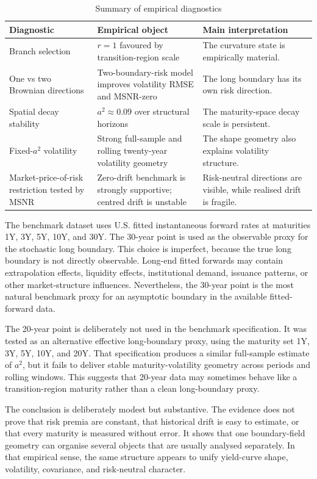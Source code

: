 \documentclass[11pt]{article}
\begin{document}
\begin{table}[htbp]
\centering
\caption{Summary of empirical diagnostics}
\label{tab:diagnostics}
\small
\begin{tabularx}{\textwidth}{@{}p{}p{}X@{}}
\toprule
Diagnostic & Empirical object & Main interpretation \\
\midrule
Branch selection & $r=1$ favoured by transition-region scale & The curvature state is empirically material. \\
One vs two Brownian directions & Two-boundary-risk model improves volatility RMSE and MSNR-zero & The long boundary has its own risk direction. \\
Spatial decay stability & $a^2\approx 0.09$ over structural horizons & The maturity-space decay scale is persistent. \\
Fixed-$a^2$ volatility & Strong full-sample and rolling twenty-year volatility geometry & The shape geometry also explains volatility structure. \\
Market-price-of-risk restriction tested by MSNR & Zero-drift benchmark is strongly supportive; centred drift is unstable & Risk-neutral directions are visible, while realised drift is fragile. \\
\bottomrule
\end{tabularx}
\end{table}

The benchmark dataset uses U.S. fitted instantaneous forward rates at maturities 1Y, 3Y, 5Y, 10Y, and 30Y. The 30-year point is used as the observable proxy for the stochastic long boundary. This choice is imperfect, because the true long boundary is not directly observable. Long-end fitted forwards may contain extrapolation effects, liquidity effects, institutional demand, issuance patterns, or other market-structure influences. Nevertheless, the 30-year point is the most natural benchmark proxy for an asymptotic boundary in the available fitted-forward data.

The 20-year point is deliberately not used in the benchmark specification. It was tested as an alternative effective long-boundary proxy, using the maturity set 1Y, 3Y, 5Y, 10Y, and 20Y. That specification produces a similar full-sample estimate of $a^2$, but it fails to deliver stable maturity-volatility geometry across periods and rolling windows. This suggests that 20-year data may sometimes behave like a transition-region maturity rather than a clean long-boundary proxy.

The conclusion is deliberately modest but substantive. The evidence does not prove that risk premia are constant, that historical drift is easy to estimate, or that every maturity is measured without error. It shows that one boundary-field geometry can organise several objects that are usually analysed separately. In that empirical sense, the same structure appears to unify yield-curve shape, volatility, covariance, and risk-neutral character.
\end{document}
